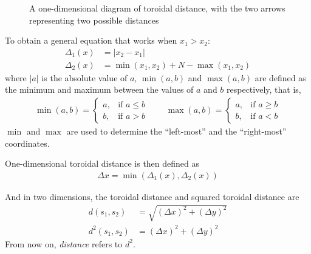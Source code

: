 \begin{figure}[htpb]
    \centering
    \caption{A one-dimensional diagram of toroidal distance, with the two arrows representing two possible distances}%
    \label{fig:2distanceexample}
\end{figure}

To obtain a general equation that works when $x_1>x_2$:%
\begin{align}
    \Delta_1(x)&=\lvert x_2-x_1 \rvert\nonumber\\
    \Delta_2(x)&=\min{(x_1,x_2)}+N-\max{(x_1,x_2)}
\end{align}
where $\lvert a\rvert$ is the absolute value of $a$, $\min{(a,b)}$ and $\max{(a,b)}$ are defined as the minimum and maximum between the values of $a$ and $b$ respectively, that is,%
\begin{align}
        \min{(a,b)}=
        \begin{cases}
            a,&\text{if $a\leq b$}\\
            b,&\text{if $a>b$}
        \end{cases}\qquad
        \max{(a,b)}=
        \begin{cases}
            a,&\text{if $a\geq b$}\\
            b,&\text{if $a<b$}
        \end{cases}
\end{align}
$\min$ and $\max$ are used to determine the  ``left-most'' and the ``right-most'' coordinates.

One-dimensional toroidal distance is then defined as%
\begin{align}
    \Delta x=\min{(\Delta_1(x),\Delta_2(x))}
\end{align}

And in two dimensions, the toroidal distance and squared toroidal distance are%
\begin{align}
    d(s_1,s_2)&=\sqrt{(\Delta x)^2+(\Delta y)^2}\nonumber\\
    d^2(s_1,s_2)&=(\Delta x)^2+(\Delta y)^2
\end{align}
From now on, \emph{distance} refers to $d^2$.

